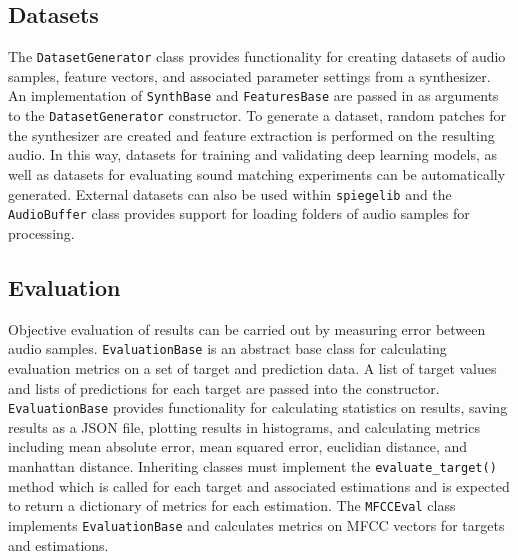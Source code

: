 \subsection{Datasets}
The \texttt{DatasetGenerator} class provides functionality for creating datasets of audio samples, feature vectors, and associated parameter settings from a synthesizer. An implementation of \texttt{SynthBase} and \texttt{FeaturesBase} are passed in as arguments to the \texttt{DatasetGenerator} constructor. To generate a dataset, random patches for the synthesizer are created and feature extraction is performed on the resulting audio. In this way, datasets for training and validating deep learning models, as well as datasets for evaluating sound matching experiments can be automatically generated. 
External datasets can also be used within \texttt{spiegelib} and the \texttt{AudioBuffer} class provides support for loading folders of audio samples for processing.

\subsection{Evaluation}
Objective evaluation of results can be carried out by measuring error between audio samples. \texttt{EvaluationBase} is an abstract base class for calculating evaluation metrics on a set of target and prediction data. A list of target values and lists of predictions for each target are passed into the constructor. \texttt{EvaluationBase} provides functionality for calculating statistics on results, saving results as a JSON file, plotting results in histograms, and calculating metrics including mean absolute error, mean squared error, euclidian distance, and manhattan distance. Inheriting classes must implement the \texttt{evaluate_target()} method which is called for each target and associated estimations and is expected to return a dictionary of metrics for each estimation. The \texttt{MFCCEval} class implements \texttt{EvaluationBase} and calculates metrics on MFCC vectors for targets and estimations.

